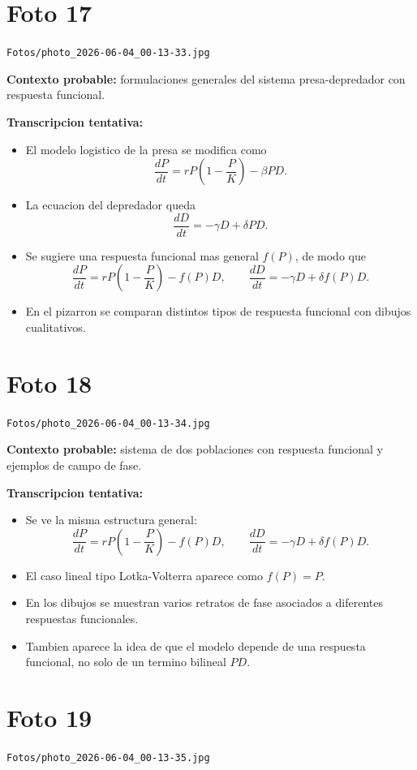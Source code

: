 \documentclass[11pt,letterpaper]{article}
\begin{document}
\section*{Foto 17}
\texttt{Fotos/photo\_2026-06-04\_00-13-33.jpg}

\textbf{Contexto probable:} formulaciones generales del sistema presa-depredador con respuesta funcional.

\textbf{Transcripcion tentativa:}
\begin{itemize}[leftmargin=*]
    \item El modelo logistico de la presa se modifica como
    \[
    \frac{dP}{dt}=rP\left(1-\frac{P}{K}\right)-\beta PD.
    \]
    \item La ecuacion del depredador queda
    \[
    \frac{dD}{dt}=-\gamma D+\delta PD.
    \]
    \item Se sugiere una respuesta funcional mas general \(f(P)\), de modo que
    \[
    \frac{dP}{dt}=rP\left(1-\frac{P}{K}\right)-f(P)D,
    \qquad
    \frac{dD}{dt}=-\gamma D+\delta f(P)D.
    \]
    \item En el pizarron se comparan distintos tipos de respuesta funcional con dibujos cualitativos.
\end{itemize}

\section*{Foto 18}
\texttt{Fotos/photo\_2026-06-04\_00-13-34.jpg}

\textbf{Contexto probable:} sistema de dos poblaciones con respuesta funcional y ejemplos de campo de fase.

\textbf{Transcripcion tentativa:}
\begin{itemize}[leftmargin=*]
    \item Se ve la misma estructura general:
    \[
    \frac{dP}{dt}=rP\left(1-\frac{P}{K}\right)-f(P)D,
    \qquad
    \frac{dD}{dt}=-\gamma D+\delta f(P)D.
    \]
    \item El caso lineal tipo Lotka-Volterra aparece como \(f(P)=P\).
    \item En los dibujos se muestran varios retratos de fase asociados a diferentes respuestas funcionales.
    \item Tambien aparece la idea de que el modelo depende de una respuesta funcional, no solo de un termino bilineal \(PD\).
\end{itemize}

\section*{Foto 19}
\texttt{Fotos/photo\_2026-06-04\_00-13-35.jpg}
\end{document}
